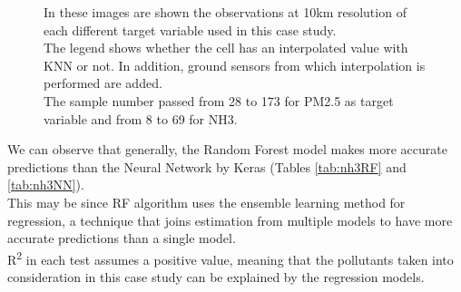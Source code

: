 \begin{figure}[H] 
    \centering
    \hfill%
    \caption{In these images are shown the observations at 10km resolution of each different target variable used in this case study. \\
    The legend shows whether the cell has an interpolated value with KNN or not. In addition, ground sensors from which interpolation is performed are added.\\ 
    The sample number passed from 28 to 173 for PM2.5 as target variable and from 8 to 69 for NH3.}
    \label{fig:comparison-sensors}
\end{figure}
We can observe that generally, the Random Forest model makes more accurate predictions than the Neural Network by Keras (Tables \ref{tab:nh3RF} and \ref{tab:nh3NN}). \\
This may be since RF algorithm uses the ensemble learning method for regression, a technique that joins estimation from multiple models to have more accurate predictions than a single model.\\ 
R\textsuperscript{2} in each test assumes a positive value, meaning that the pollutants taken into consideration in this case study can be explained by the regression models. 

